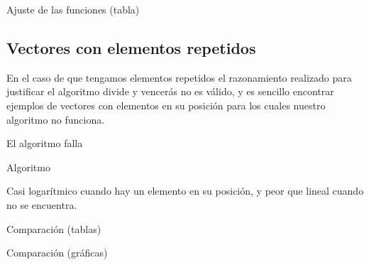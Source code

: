 \begin{frame}{Ajuste de las funciones (tabla)}
\end{frame}

\subsection{Vectores con elementos repetidos}

En el caso de que tengamos elementos repetidos el razonamiento realizado para justificar el algoritmo divide y vencerás no es válido, y es sencillo encontrar ejemplos de vectores con elementos en su posición para los cuales nuestro algoritmo no funciona.

\begin{frame}{El algoritmo falla}
\end{frame}

\begin{frame}[fragile]{Algoritmo}

Casi logarítmico cuando hay un elemento en su posición, y peor que lineal cuando no se encuentra.
\end{frame}

\begin{frame}{Comparación (tablas)}
\end{frame}

\begin{frame}{Comparación (gráficas)}
\end{frame}
